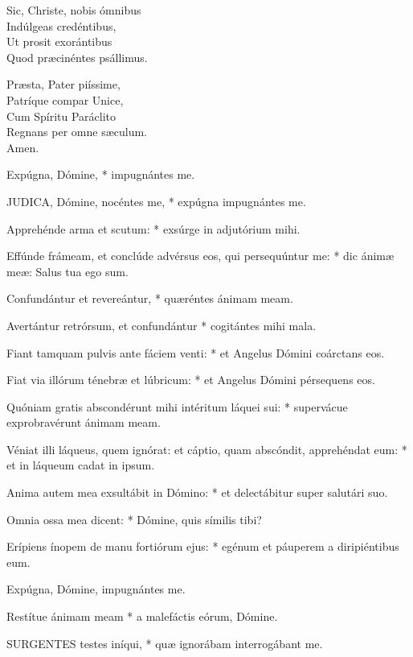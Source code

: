 Sic, Christe, nobis ómnibus\\
Indúlgeas credéntibus,\\
Ut prosit exorántibus\\
Quod præcinéntes psállimus.

Præsta, Pater piíssime,\\
Patríque compar Unice,\\
Cum Spíritu Paráclito\\
Regnans per omne sæculum.\\
Amen.


 Expúgna, Dómine, * impugnántes me.


\lettrine[lines=2]{J}{UDICA}, Dómine, nocéntes me, * expúgna impugnántes me.

Apprehénde arma et scutum: * exsúrge in adjutórium mihi.

Effúnde frámeam, et conclúde advérsus eos, qui persequúntur me: * dic ánimæ meæ: Salus tua ego sum.

Confundántur et revereántur, * quæréntes ánimam meam.

Avertántur retrórsum, et confundántur * cogitántes mihi mala.

Fiant tamquam pulvis ante fáciem venti: * et Angelus Dómini coárctans eos.

Fiat via illórum ténebræ et lúbricum: * et Angelus Dómini pérsequens eos.

Quóniam gratis abscondérunt mihi intéritum láquei sui: * supervácue exprobravérunt ánimam meam.

Véniat illi láqueus, quem ignórat: et cáptio, quam abscóndit, apprehéndat eum: * et in láqueum cadat in ipsum.

Anima autem mea exsultábit in Dómino: * et delectábitur super salutári suo.

Omnia ossa mea dicent: * Dómine, quis símilis tibi?

Erípiens ínopem de manu fortiórum ejus: * egénum et páuperem a diripiéntibus eum.

 Expúgna, Dómine, impugnántes me.

 Restítue ánimam meam * a malefáctis eórum, Dómine.


\lettrine[lines=2]{S}{URGENTES} testes iníqui, * quæ ignorábam interrogábant me.

